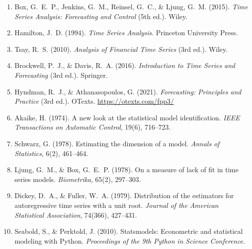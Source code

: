 \documentclass[12pt,a4paper]{article}
\begin{document}
\begin{enumerate}
  \item Box, G.~E.~P., Jenkins, G.~M., Reinsel, G.~C., \& Ljung, G.~M. (2015).
        \textit{Time Series Analysis: Forecasting and Control} (5th ed.). Wiley.

  \item Hamilton, J.~D. (1994). \textit{Time Series Analysis}. Princeton University Press.

  \item Tsay, R.~S. (2010). \textit{Analysis of Financial Time Series} (3rd ed.). Wiley.

  \item Brockwell, P.~J., \& Davis, R.~A. (2016). \textit{Introduction to Time Series
        and Forecasting} (3rd ed.). Springer.

  \item Hyndman, R.~J., \& Athanasopoulos, G. (2021). \textit{Forecasting: Principles
        and Practice} (3rd ed.). OTexts. \url{https://otexts.com/fpp3/}

  \item Akaike, H. (1974). A new look at the statistical model identification.
        \textit{IEEE Transactions on Automatic Control}, 19(6), 716--723.

  \item Schwarz, G. (1978). Estimating the dimension of a model.
        \textit{Annals of Statistics}, 6(2), 461--464.

  \item Ljung, G.~M., \& Box, G.~E.~P. (1978). On a measure of lack of fit in time
        series models. \textit{Biometrika}, 65(2), 297--303.

  \item Dickey, D.~A., \& Fuller, W.~A. (1979). Distribution of the estimators for
        autoregressive time series with a unit root. \textit{Journal of the American
        Statistical Association}, 74(366), 427--431.

  \item Seabold, S., \& Perktold, J. (2010). Statsmodels: Econometric and statistical
        modeling with Python. \textit{Proceedings of the 9th Python in Science Conference}.
\end{enumerate}
\end{document}
